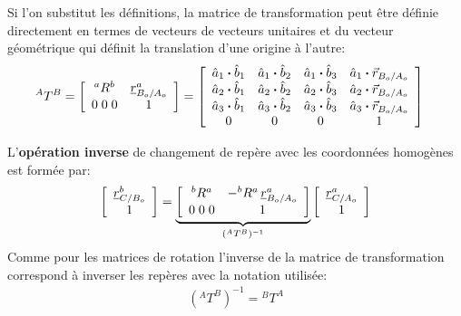 Si l'on substitut les définitions, la matrice de transformation peut être définie directement en termes de vecteurs de vecteurs unitaires et du vecteur géométrique qui définit la translation d'une origine à l'autre:
\begin{align}
{}^AT^B &=
\left[ \begin{array}{c c }
		   ^aR^b & \underline{r}_{B_o/A_o}^a \\ 0 \; 0 \; 0 & 1
\end{array} \right]
=
\left[ \begin{array}{c c c c}
		   \hat{a}_1 \boldsymbol{\cdot} \hat{b}_1  &  \hat{a}_1 \boldsymbol{\cdot} \hat{b}_2  &  \hat{a}_1 \boldsymbol{\cdot} \hat{b}_3 & \hat{a}_1 \boldsymbol{\cdot} \vec{r}_{B_o/A_o} \\
		   \hat{a}_2 \boldsymbol{\cdot} \hat{b}_1  &  \hat{a}_2 \boldsymbol{\cdot} \hat{b}_2  &  \hat{a}_2 \boldsymbol{\cdot} \hat{b}_3 & \hat{a}_2 \boldsymbol{\cdot} \vec{r}_{B_o/A_o}\\
		   \hat{a}_3 \boldsymbol{\cdot} \hat{b}_1  &  \hat{a}_3 \boldsymbol{\cdot} \hat{b}_2  &  \hat{a}_3 \boldsymbol{\cdot} \hat{b}_3 & \hat{a}_3 \boldsymbol{\cdot} \vec{r}_{B_o/A_o} \\
		   0 & 0 & 0 & 1
\end{array} \right]
\label{eq:transformationdef}
\end{align}


L'\textbf{opération inverse} de changement de repère avec les coordonnées homogènes est formée par:
\begin{align}
	\left[ \begin{array}{c}
			   \underline{r}_{C/B_o}^b \\ 1
	\end{array} \right]
	=
	\underbrace{
		\left[ \begin{array}{c c }
				   ^bR^a & - ^bR^a \, \underline{r}_{B_o/A_o}^a \\ 0 \; 0 \; 0 & 1
		\end{array} \right]
	}_{ ({}^AT^B)^{-1} }
	\left[ \begin{array}{c}
			   \underline{r}_{C/A_o}^a \\ 1
	\end{array} \right]
\end{align}
Comme pour les matrices de rotation l'inverse de la matrice de transformation correspond à inverser les repères avec la notation utilisée:
\begin{align}
	({}^AT^B)^{-1}= {}^BT^A
\end{align}

